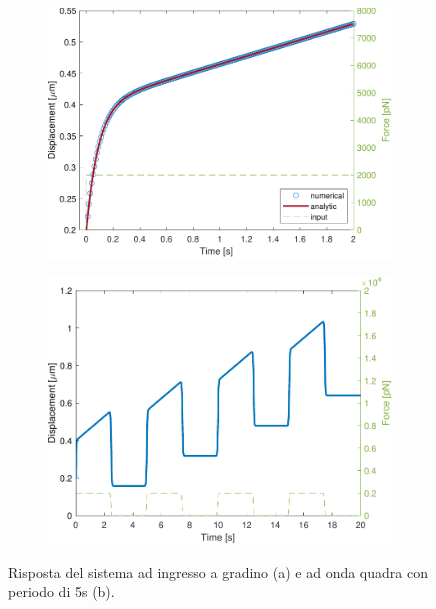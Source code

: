 \begin{figure}[t!]
	\begin{subfigure}{0.5\linewidth}
	\centering
\includegraphics[width=0.95\linewidth]{../code/figs/step}
\caption{}
\label{fig:square}
	\end{subfigure}\hfill
	\begin{subfigure}{0.5\linewidth}
	\centering
\includegraphics[width=0.95\linewidth]{../code/figs/square}
\caption{}
\label{fig:step}
\end{subfigure}\hfill
\caption{Risposta del sistema ad ingresso a gradino (a) e ad onda quadra con periodo di 5s (b).}
\end{figure}

